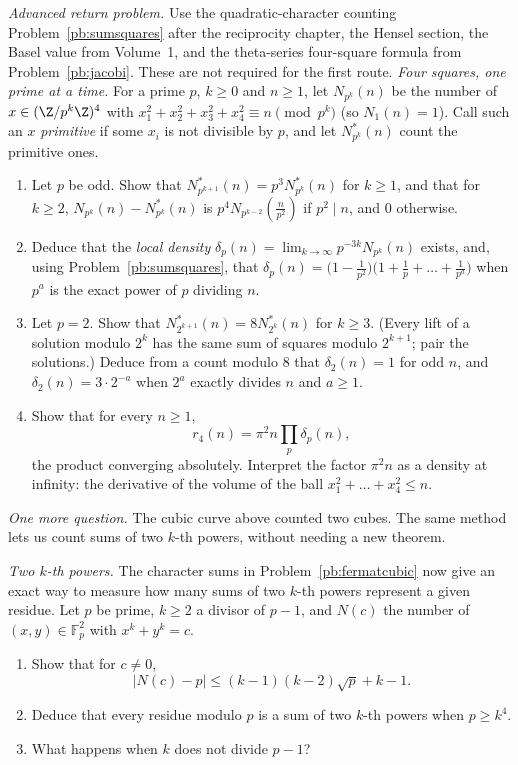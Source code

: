 \begin{exercise}[Journey]\label{pb:densities}
\emph{Advanced return problem.} Use the quadratic-character counting
Problem~\ref{pb:sumsquares} after the reciprocity chapter, the Hensel
section, the Basel value from Volume~1, and the theta-series
four-square formula from Problem~\ref{pb:jacobi}. These are
not required for the first route.
\emph{Four squares, one prime at a time.} For a prime $p$, $k\ge0$ and $n\ge1$, let $N_{p^k}(n)$ be the number of $x\in(\Z/p^k\Z)^4$ with
$x_1^2+x_2^2+x_3^2+x_4^2\equiv n\pmod{p^k}$ (so $N_1(n)=1$). Call such an $x$ \emph{primitive} if some $x_i$ is not divisible by $p$, and let $N^*_{p^k}(n)$ count the
primitive ones.
\begin{enumerate}[label=(\alph*)]
\item Let $p$ be odd. Show that $N^*_{p^{k+1}}(n)=p^3N^*_{p^k}(n)$ for $k\ge1$, and that for $k\ge2$, $N_{p^k}(n)-N^*_{p^k}(n)$ is $p^4N_{p^{k-2}}(\frac n{p^2})$ if
$p^2\mid n$, and $0$ otherwise.
\item Deduce that the \emph{local density} $\delta_p(n)=\lim_{k\to\infty}p^{-3k}N_{p^k}(n)$ exists, and, using Problem~\ref{pb:sumsquares}, that
$\delta_p(n)=\bigl(1-\frac1{p^2}\bigr)\bigl(1+\frac1p+\dots+\frac1{p^a}\bigr)$ when $p^a$ is the exact power of $p$ dividing $n$.
\item Let $p=2$. Show that $N^*_{2^{k+1}}(n)=8N^*_{2^k}(n)$ for $k\ge3$. (Every lift of a solution modulo $2^k$ has the same sum of squares modulo $2^{k+1}$; pair the
solutions.) Deduce from a count modulo $8$ that $\delta_2(n)=1$ for odd $n$, and $\delta_2(n)=3\cdot2^{-a}$ when $2^a$ exactly divides $n$ and $a\ge1$.
\item Show that for every $n\ge1$,
\[
r_4(n)=\pi^2n\prod_p\delta_p(n),
\]
the product converging absolutely. Interpret the factor $\pi^2n$ as a density at infinity: the derivative of the volume of the ball $x_1^2+\dots+x_4^2\le n$.
\end{enumerate}
\end{exercise}

\medskip
\noindent\emph{One more question.} The cubic curve above counted
two cubes. The same method lets us count sums of two
$k$-th powers, without needing a new theorem.

\begin{exercise}[$\star\star\star$]\label{pb:waring}
\emph{Two $k$-th powers.}
The character sums in Problem~\ref{pb:fermatcubic}
now give an exact way to measure how many sums of two
$k$-th powers represent a given residue.
Let $p$ be prime, $k\ge2$ a divisor of $p-1$, and $N(c)$ the number of $(x,y)\in\mathbb F_p^2$ with
$x^k+y^k=c$.
\begin{enumerate}[label=(\alph*)]
\item Show that for $c\ne0$,
\[
|N(c)-p|\le(k-1)(k-2)\sqrt p+k-1.
\]
\item Deduce that every residue modulo $p$ is a sum of two $k$-th powers when $p\ge k^4$.
\item What happens when $k$ does not divide $p-1$?
\end{enumerate}
\end{exercise}

